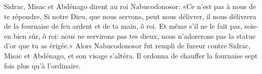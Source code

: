 Sidrac, Misac et Abdénago dirent au roi Nabucodonosor:
	«Ce n’est pas à nous de te répondre.
Si notre Dieu, que nous servons, peut nous délivrer,
	il nous délivrera de la fournaise de feu ardent et de ta main, ô roi.
Et même s’il ne le fait pas, sois-en bien sûr, ô roi:
	nous ne servirons pas tes dieux,
	nous n’adorerons pas la statue d’or que tu as érigée.»
Alors Nabucodonosor fut rempli de fureur contre Sidrac, Misac et Abdénago,
	et son visage s’altéra.
Il ordonna de chauffer la fournaise sept fois plus qu’à l’ordinaire.
